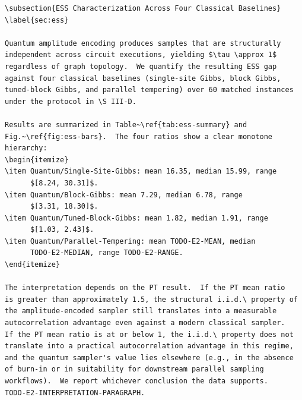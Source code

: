 \begin{verbatim}
\subsection{ESS Characterization Across Four Classical Baselines}
\label{sec:ess}

Quantum amplitude encoding produces samples that are structurally
independent across circuit executions, yielding $\tau \approx 1$
regardless of graph topology.  We quantify the resulting ESS gap
against four classical baselines (single-site Gibbs, block Gibbs,
tuned-block Gibbs, and parallel tempering) over 60 matched instances
under the protocol in \S III-D.

Results are summarized in Table~\ref{tab:ess-summary} and
Fig.~\ref{fig:ess-bars}.  The four ratios show a clear monotone
hierarchy:
\begin{itemize}
\item Quantum/Single-Site-Gibbs: mean 16.35, median 15.99, range
      $[8.24, 30.31]$.
\item Quantum/Block-Gibbs: mean 7.29, median 6.78, range
      $[3.31, 18.30]$.
\item Quantum/Tuned-Block-Gibbs: mean 1.82, median 1.91, range
      $[1.03, 2.43]$.
\item Quantum/Parallel-Tempering: mean TODO-E2-MEAN, median
      TODO-E2-MEDIAN, range TODO-E2-RANGE.
\end{itemize}

The interpretation depends on the PT result.  If the PT mean ratio
is greater than approximately 1.5, the structural i.i.d.\ property of
the amplitude-encoded sampler still translates into a measurable
autocorrelation advantage even against a modern classical sampler.
If the PT mean ratio is at or below 1, the i.i.d.\ property does not
translate into a practical autocorrelation advantage in this regime,
and the quantum sampler's value lies elsewhere (e.g., in the absence
of burn-in or in suitability for downstream parallel sampling
workflows).  We report whichever conclusion the data supports.
TODO-E2-INTERPRETATION-PARAGRAPH.


\end{verbatim}
